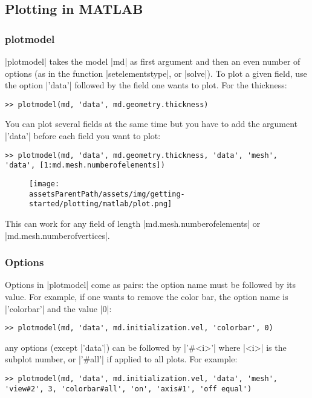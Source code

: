 
\subsection{Plotting in MATLAB} \label{sec:getting-started-matlab-plotting} 
\subsubsection{plotmodel}%
\lstinlinebg|plotmodel| takes the model \lstinlinebg|md| as first argument and then an even number of options (as in the function \lstinlinebg|setelementstype|, or \lstinlinebg|solve|). To plot a given field, use the option \lstinlinebg|'data'| followed by the field one wants to plot. For the thickness:
\begin{lstlisting}
>> plotmodel(md, 'data', md.geometry.thickness)
\end{lstlisting}
You can plot several fields at the same time but you have to add the argument \lstinlinebg|'data'| before each field you want to plot:
\begin{lstlisting}
>> plotmodel(md, 'data', md.geometry.thickness, 'data', 'mesh', 'data', [1:md.mesh.numberofelements])
\end{lstlisting}
\begin{figure}[H]
	\begin{center}
		\texttt{[image: \\assetsParentPath/assets/img/getting-started/plotting/matlab/plot.png]}
	\end{center}
\end{figure}
This can work for any field of length \lstinlinebg|md.mesh.numberofelements| or \lstinlinebg|md.mesh.numberofvertices|.
\subsubsection{Options}%
Options in \lstinlinebg|plotmodel| come as pairs: the option name must be followed by its value. For example, if one wants to remove the color bar, the option name is \lstinlinebg|'colorbar'| and the value \lstinlinebg|0|:
\begin{lstlisting}
>> plotmodel(md, 'data', md.initialization.vel, 'colorbar', 0)
\end{lstlisting}
any options (except \lstinlinebg|'data'|) can be followed by \lstinlinebg|'#<i>'| where \lstinlinebg|<i>| is the subplot number, or \lstinlinebg|'#all'| if applied to all plots. For example:
\begin{lstlisting}
>> plotmodel(md, 'data', md.initialization.vel, 'data', 'mesh', 'view#2', 3, 'colorbar#all', 'on', 'axis#1', 'off equal')
\end{lstlisting}


